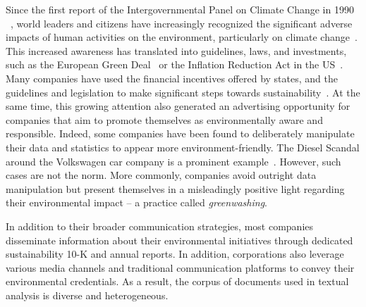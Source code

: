 Since the first report of the Intergovernmental Panel on Climate Change in 1990 ~\cite{change1990ipcc},
world leaders and citizens have increasingly recognized the significant adverse impacts of human activities on the environment, particularly on climate change~\cite{climatebriefhistory}. This increased awareness has translated into guidelines, laws, and investments, such as the European Green Deal~\cite{europeangreendeal} or the Inflation Reduction Act in the US~\cite{inflationact}. Many companies have used the financial incentives offered by states, and the guidelines and legislation to make significant steps towards sustainability~\cite{greencompanies}. At the same time, this growing attention also generated an advertising opportunity for companies that aim to promote themselves as environmentally aware and responsible. 
Indeed, %
some companies have been found to deliberately manipulate their data and statistics to appear more environment-friendly. The Diesel Scandal around the Volkswagen car company is a prominent example~\cite{volkswagen}. However, such cases are not the norm. More commonly, companies avoid outright data manipulation but present themselves in a misleadingly positive light regarding their environmental impact  -- a practice called \emph{greenwashing}. 

In addition to their broader communication strategies, most companies disseminate information about their environmental initiatives through dedicated sustainability 10-K and annual reports. In addition, corporations also leverage various media channels and traditional communication platforms to convey their environmental credentials. As a result, the corpus of documents used in textual analysis is diverse and heterogeneous.

